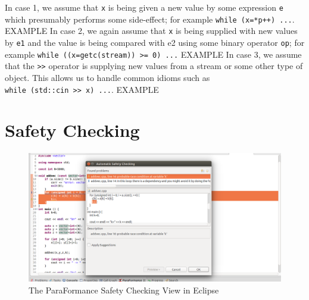 \noindent
In case 1, we assume that \texttt{x} is being given a new value by some
expression \texttt{e} which presumably performs some side-effect; for
example \texttt{while\ (x=*p++)\ ...}. EXAMPLE
% 
In case 2, we again assume that \texttt{x} is being supplied with new
values by \texttt{e1} and the value is being compared with e2 using some
binary operator \texttt{op}; for example
\texttt{while\ ((x=getc(stream))\ \textgreater{}=\ 0)\ ...} EXAMPLE
% 
In case 3, we assume that the \texttt{\textgreater{}\textgreater{}}
operator is supplying new values from a stream or some other type of
object. This allows us to handle common idioms such as
\texttt{while\ (std::cin\ \textgreater{}\textgreater{}\ x)\ ...}. EXAMPLE

%

\section{Safety Checking}
\begin{figure}
\centering
\includegraphics[scale=0.26]{figures/pf-safety-auto-dialog.png}
\caption{The ParaFormance Safety Checking View in Eclipse}
\label{fig:safety1}
\end{figure}

